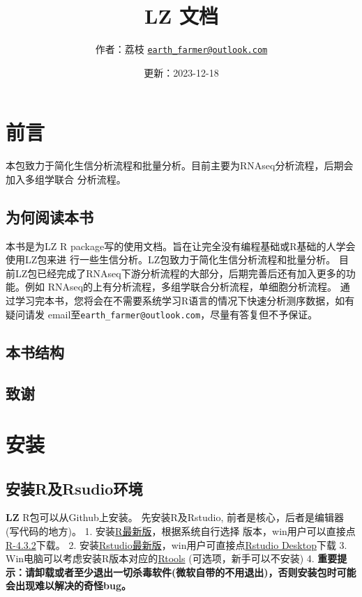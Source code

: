 \documentclass[
]{book}
\title{LZ 文档}
\author{作者：荔枝 \href{mailto:earth_farmer@outlook.com}{\nolinkurl{earth\_farmer@outlook.com}}}
\date{更新：2023-12-18}
\begin{document}
\maketitle

{
\setcounter{tocdepth}{1}
\tableofcontents
}
\chapter*{前言}\label{ux524dux8a00}

本包致力于简化生信分析流程和批量分析。目前主要为RNAseq分析流程，后期会加入多组学联合
分析流程。

\section*{为何阅读本书}\label{ux4e3aux4f55ux9605ux8bfbux672cux4e66}

本书是为LZ R package写的使用文档。旨在让完全没有编程基础或R基础的人学会使用LZ包来进
行一些生信分析。LZ包致力于简化生信分析流程和批量分析。
目前LZ包已经完成了RNAseq下游分析流程的大部分，后期完善后还有加入更多的功能。例如
RNAseq的上有分析流程，多组学联合分析流程，单细胞分析流程。
通过学习完本书，您将会在不需要系统学习R语言的情况下快速分析测序数据，如有疑问请发
email至\texttt{earth\_farmer@outlook.com}，尽量有答复但不予保证。

\section*{本书结构}\label{ux672cux4e66ux7ed3ux6784}

\section*{致谢}\label{ux81f4ux8c22}

\chapter{安装}\label{install}

\section{安装R及Rsudio环境}\label{ux5b89ux88c5rux53carsudioux73afux5883}

\textbf{LZ} R包可以从Github上安装。
先安装R及Rstudio, 前者是核心，后者是编辑器(写代码的地方)。
1. 安装\href{https://mirrors.tuna.tsinghua.edu.cn/CRAN/bin/}{R最新版}，根据系统自行选择
版本，win用户可以直接点\href{https://mirrors.tuna.tsinghua.edu.cn/CRAN/bin/windows/base/R-4.3.2-win.exe}{R-4.3.2}下载。
2. 安装\href{https://posit.co/download/rstudio-desktop/}{Rstudio最新版}，win用户可直接点\href{https://download1.rstudio.org/electron/windows/RStudio-2023.09.1-494.exe}{Rstudio Desktop}下载
3. Win电脑可以考虑安装R版本对应的\href{https://cran.r-project.org/bin/windows/Rtools/}{Rtools} (可选项，新手可以不安装)
4. \textbf{重要提示：请卸载或者至少退出一切杀毒软件(微软自带的不用退出)，否则安装包时可能会出现难以解决的奇怪bug。}
\end{document}
